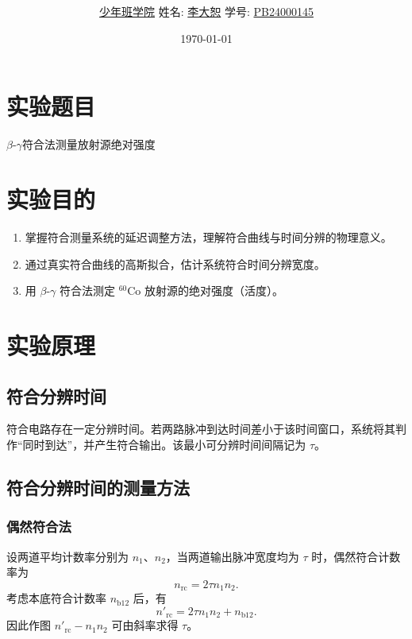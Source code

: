 \documentclass[12pt,a4paper]{article}
\title{\Huge{\textbf{\uuline{实\ 验\ 报\ 告}}}}
\author{\uline{少年班学院} \quad 姓名: \uline{李大恕} \quad 学号: \uline{PB24000145}}
\date{\today}
\begin{document}
\maketitle

\section{实验题目}
$\beta$-$\gamma$符合法测量放射源绝对强度

\section{实验目的}
\begin{enumerate}
    \item 掌握符合测量系统的延迟调整方法，理解符合曲线与时间分辨的物理意义。
    \item 通过真实符合曲线的高斯拟合，估计系统符合时间分辨宽度。
    \item 用 $\beta$-$\gamma$ 符合法测定 $^{60}\mathrm{Co}$ 放射源的绝对强度（活度）。
\end{enumerate}

\section{实验原理}
\subsection{符合分辨时间}
符合电路存在一定分辨时间。若两路脉冲到达时间差小于该时间窗口，系统将其判作“同时到达”，并产生符合输出。该最小可分辨时间间隔记为 $\tau$。

\subsection{符合分辨时间的测量方法}
\subsubsection{偶然符合法}
设两道平均计数率分别为 $n_1$、$n_2$，当两道输出脉冲宽度均为 $\tau$ 时，偶然符合计数率为
\begin{equation}
    n_{\mathrm{rc}} = 2\tau n_1 n_2.
\end{equation}
考虑本底符合计数率 $n_{\mathrm{b}12}$ 后，有
\begin{equation}
    n'_{\mathrm{rc}} = 2\tau n_1 n_2 + n_{\mathrm{b}12}.
\end{equation}
因此作图 $n'_{\mathrm{rc}}-n_1n_2$ 可由斜率求得 $\tau$。
\end{document}
